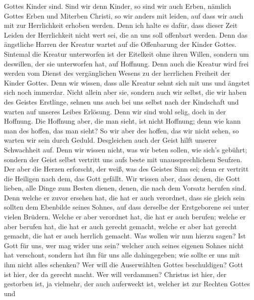 Gottes Kinder sind.  Sind wir denn Kinder, so sind wir auch
Erben, nämlich Gottes Erben und Miterben Christi, so wir anders mit
leiden, auf dass wir auch mit zur Herrlichkeit erhoben werden.
 Denn ich halte es dafür, dass dieser Zeit Leiden der
Herrlichkeit nicht wert sei, die an uns soll offenbart werden.
 Denn das ängstliche Harren der Kreatur wartet auf die
Offenbarung der Kinder Gottes.  Sintemal die Kreatur
unterworfen ist der Eitelkeit ohne ihren Willen, sondern um deswillen,
der sie unterworfen hat, auf Hoffnung.  Denn auch die
Kreatur wird frei werden vom Dienst des vergänglichen Wesens zu der
herrlichen Freiheit der Kinder Gottes.  Denn wir wissen,
dass alle Kreatur sehnt sich mit uns und ängstet sich noch immerdar.
 Nicht allein aber sie, sondern auch wir selbst, die wir
haben des Geistes Erstlinge, sehnen uns auch bei uns selbst nach der
Kindschaft und warten auf unseres Leibes Erlösung.  Denn
wir sind wohl selig, doch in der Hoffnung. Die Hoffnung aber, die man
sieht, ist nicht Hoffnung; denn wie kann man des hoffen, das man sieht?
 So wir aber des hoffen, das wir nicht sehen, so warten wir
sein durch Geduld.  Desgleichen auch der Geist hilft
unserer Schwachheit auf. Denn wir wissen nicht, was wir beten sollen,
wie sich's gebührt; sondern der Geist selbst vertritt uns aufs beste mit
unaussprechlichem Seufzen.  Der aber die Herzen erforscht,
der weiß, was des Geistes Sinn sei; denn er vertritt die Heiligen nach
dem, das Gott gefällt.  Wir wissen aber, dass denen, die
Gott lieben, alle Dinge zum Besten dienen, denen, die nach dem Vorsatz
berufen sind.  Denn welche er zuvor ersehen hat, die hat er
auch verordnet, dass sie gleich sein sollten dem Ebenbilde seines
Sohnes, auf dass derselbe der Erstgeborene sei unter vielen Brüdern.
 Welche er aber verordnet hat, die hat er auch berufen;
welche er aber berufen hat, die hat er auch gerecht gemacht, welche er
aber hat gerecht gemacht, die hat er auch herrlich gemacht.
 Was wollen wir nun hierzu sagen? Ist Gott für uns, wer mag
wider uns sein?  welcher auch seines eigenen Sohnes nicht
hat verschont, sondern hat ihn für uns alle dahingegeben; wie sollte er
uns mit ihm nicht alles schenken?  Wer will die
Auserwählten Gottes beschuldigen? Gott ist hier, der da gerecht macht.
 Wer will verdammen? Christus ist hier, der gestorben ist,
ja vielmehr, der auch auferweckt ist, welcher ist zur Rechten Gottes und
